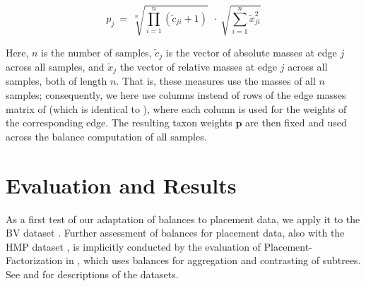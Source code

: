 \begin{equation}
    \label{ch:Balances:sec:Methods:eq:EdgeWeights}
    p_j ~=~ \sqrt[n]{ \prod_{i=1}^{n} ( \tilde{c}_{ji} + 1 ) }  ~~\cdot~  \sqrt{ \sum_{i=1}^{n} \tilde{x}_{ji}^2 }
\end{equation}

Here, $n$ is the number of samples, $\tilde{c}_j$ is the vector of absolute masses at edge $j$ across all samples,
and $\tilde{x}_j$ the vector of relative masses at edge $j$ across all samples, both of length $n$.
That is, these measures use the masses of all $n$ samples;
consequently, we here use columns instead of rows of the edge masses matrix of 
(which is identical to ),
where each column is used for the weights of the corresponding edge.
The resulting taxon weights $\bm{p}$ are then fixed and used across the balance computation of all samples.



\section{Evaluation and Results}
\label{ch:Balances:sec:Results}

As a first test of our adaptation of balances to placement data, we apply it to the \ac{BV} dataset \cite{Srinivasan2012}.
Further assessment of balances for placement data, also with the \ac{HMP} dataset \cite{Huttenhower2012,Methe2012},
is implicitly conducted by the evaluation of Placement-Factorization in ,
which uses balances for aggregation and contrasting of subtrees.
See  and 
for descriptions of the datasets.

